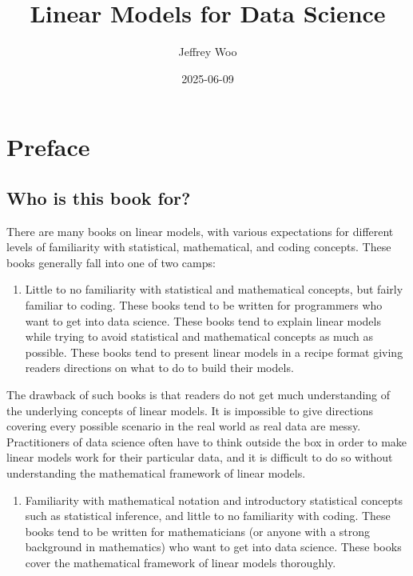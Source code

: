 \documentclass[
]{book}
\title{Linear Models for Data Science}
\author{Jeffrey Woo}
\date{2025-06-09}
\providecommand{\tightlist}{%
  \setlength{\itemsep}{0pt}\setlength{\parskip}{0pt}}
\begin{document}
\maketitle

{
\setcounter{tocdepth}{1}
\tableofcontents
}
\hypertarget{preface}{%
\chapter*{Preface}\label{preface}}

\hypertarget{who-is-this-book-for}{%
\section*{Who is this book for?}\label{who-is-this-book-for}}

There are many books on linear models, with various expectations for different levels of familiarity with statistical, mathematical, and coding concepts. These books generally fall into one of two camps:

\begin{enumerate}
\def\labelenumi{\arabic{enumi}.}
\tightlist
\item
  Little to no familiarity with statistical and mathematical concepts, but fairly familiar to coding. These books tend to be written for programmers who want to get into data science. These books tend to explain linear models while trying to avoid statistical and mathematical concepts as much as possible. These books tend to present linear models in a recipe format giving readers directions on what to do to build their models.
\end{enumerate}

The drawback of such books is that readers do not get much understanding of the underlying concepts of linear models. It is impossible to give directions covering every possible scenario in the real world as real data are messy. Practitioners of data science often have to think outside the box in order to make linear models work for their particular data, and it is difficult to do so without understanding the mathematical framework of linear models.

\begin{enumerate}
\def\labelenumi{\arabic{enumi}.}
\setcounter{enumi}{1}
\tightlist
\item
  Familiarity with mathematical notation and introductory statistical concepts such as statistical inference, and little to no familiarity with coding. These books tend to be written for mathematicians (or anyone with a strong background in mathematics) who want to get into data science. These books cover the mathematical framework of linear models thoroughly.
\end{enumerate}
\end{document}
